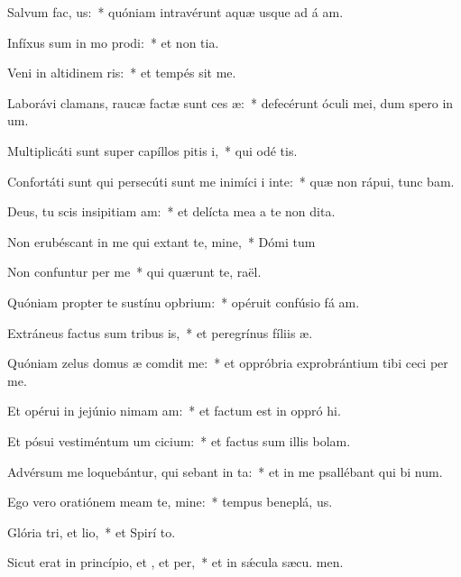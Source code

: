 \item Salvum  fac, us:~* quóniam intravérunt aquæ usque ad á am.
\item Infíxus sum in mo prodi:~* et non  tia.
\item Veni in altidinem ris:~* et tempés sit me.
\item Laborávi clamans, raucæ factæ sunt ces æ:~* defecérunt óculi mei, dum spero in  um.
\item Multiplicáti sunt super capíllos pitis i,~* qui odé  tis.
\item Confortáti sunt qui persecúti sunt me inimíci i inte:~* quæ non rápui, tunc bam.
\item Deus, tu scis insipitiam am:~* et delícta mea a te non  dita.
\item Non erubéscant in me qui extant te, mine,~* Dómi tum
\item Non confuntur per me~* qui quærunt te,  raël.
\item Quóniam propter te sustínu opbrium:~* opéruit confúsio fá am.
\item Extráneus factus sum tribus is,~* et peregrínus fíliis  æ.
\item Quóniam zelus domus æ comdit me:~* et oppróbria exprobrántium tibi ceci per me.
\item Et opérui in jejúnio nimam am:~* et factum est in oppró hi.
\item Et pósui vestiméntum um cicium:~* et factus sum illis  bolam.
\item Advérsum me loquebántur, qui sebant in ta:~* et in me psallébant qui bi num.
\item Ego vero oratiónem meam  te, mine:~* tempus beneplá, us.
\item Glória tri, et lio,~* et Spirí to.
\item Sicut erat in princípio, et , et per,~* et in sǽcula sæcu. men.
